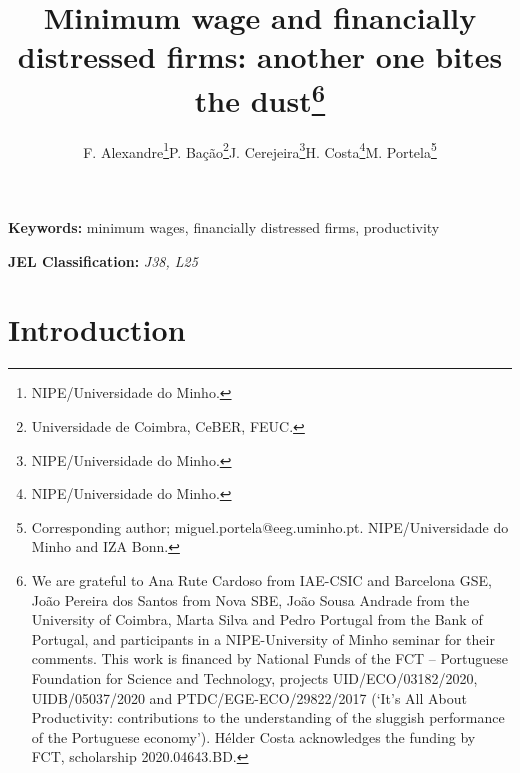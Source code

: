 \documentclass[12pt]{article}
\begin{document}
\title{Minimum wage and financially distressed firms: another one bites the dust\thanks{We are grateful to Ana Rute Cardoso from IAE-CSIC and Barcelona GSE, João Pereira dos Santos from Nova SBE, João Sousa Andrade from the University of Coimbra, Marta Silva and Pedro Portugal from the Bank of Portugal, and participants in a NIPE-University of Minho seminar for their comments.
This work is financed by National Funds of the FCT – Portuguese Foundation for Science and Technology, projects UID/ECO/03182/2020, UIDB/05037/2020 and PTDC/EGE-ECO/29822/2017 (`It’s All About Productivity: contributions to the understanding of the sluggish performance of the Portuguese economy'). Hélder Costa acknowledges the funding by FCT, scholarship 2020.04643.BD.}}

\author{F. Alexandre\thanks{NIPE/Universidade do Minho.}\quad P. Bação\thanks{Universidade de Coimbra, CeBER, FEUC.}\quad J. Cerejeira\thanks{NIPE/Universidade do Minho.}\quad H. Costa\thanks{NIPE/Universidade do Minho.}\quad M. Portela\thanks{Corresponding author; miguel.portela@eeg.uminho.pt. NIPE/Universidade do Minho and IZA Bonn.}}

\maketitle


\begin{abstract}
\end{abstract}

\textbf{Keywords:} minimum wages, financially distressed firms, productivity

\textbf{JEL Classification:} \textit{J38, L25}



\section{Introduction}

\lipsum[1-2]


\end{document}
